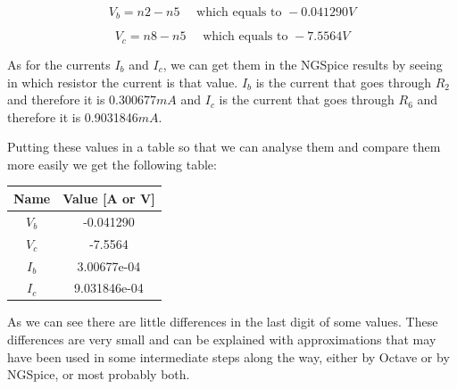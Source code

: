 \begin{equation}
  V_b = n2 - n5 \quad \text{ which equals to } -0.041290V
  \label{eq18}
\end{equation}

\begin{equation}
  V_c = n8 - n5 \quad \text{ which equals to } -7.5564V
  \label{eq19}
\end{equation}

As for the currents $I_b$ and $I_c$, we can get them in the NGSpice results by seeing in which resistor the current is that value. $I_b$ is the current that goes through $R_2$ and therefore it is 0.300677$mA$ and $I_c$ is the current that goes through $R_6$ and therefore it is 0.9031846$mA$. \par
Putting these values in a table so that we can analyse them and compare them more easily we get the following table:

\begin{center}
  \begin{tabular}{ | c | c | }
    \hline    
    {\bf Name} & {\bf Value [A or V]} \\ \hline
    $V_b$ & -0.041290 \\ \hline 
    $V_c$ & -7.5564 \\ \hline 
    $I_b$ & 3.00677e-04 \\ \hline 
    $I_c$ & 9.031846e-04 \\ 
    \hline
  \end{tabular}
\end{center}

As we can see there are little differences in the last digit of some values. These differences are very small and can be explained with approximations that may have been used in some intermediate steps along the way, either by Octave or by NGSpice, or most probably both.


